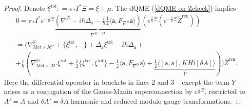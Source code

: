 \documentclass[11pt,a4paper]{amsart}
\theoremstyle{plain} %
\theoremstyle{definition}
\theoremstyle{remark}
\newcommand{\mr}{\mathrm}
\newcommand{\sfa}{\mathsf{a}}
\newcommand{\M}{\mathcal{M}}
\newcommand{\mc}{\mathcal}
\begin{document}
\begin{proof}%
    Denote $\xi^\mr{tot}\colon = \pi_*I^* \Xi=\xi+\mu$. The dQME (\ref{dQME on Zcheck}) implies 
    \begin{multline}\label{lemma 5.11 proof eq1}
    0=\pi_*I^* e^{-\frac{i}{\hbar}\Xi}\underbrace{(\nabla^\mc{D}-i\hbar\Delta_\sfa-\frac{i}{\hbar}\frac12 \langle \sfa, F_{\nabla^\mathbb{H}}\sfa\rangle)}_{\nabla^{G-M}} (e^{\frac{i}{\hbar}\Xi}(e^{-\frac{i}{\hbar}\Xi} \check{Z}^\mr{ren}) )\\
    =
    \Big(\nabla^\mathbb{H}_{\mr{Met}\times \M'}+\{\xi^\mr{tot},-\}+\Delta_\sfa \xi^\mr{tot}-i\hbar\Delta_\sfa+\\
    +\frac{i}{\hbar}(\nabla^\mathbb{H}_{\mr{Met}\times \M'}\xi^\mr{tot}+\frac12 \{\xi^\mr{tot},\xi^\mr{tot}\}-\frac12 \langle \sfa, F_{\nabla^\mathbb{H}}\sfa\rangle +\underbrace{\frac12\langle [\sfa,\sfa],KHi[\delta A] \rangle}_Y) 
    \Big) \overline{Z}^\mr{ren}.
    \end{multline}
    Here  the differential operator in brackets in lines 2 and 3 -- except the term $Y$ -- arises as a conjugation of the Gauss-Manin superconnection by $e^{\frac{i}{\hbar}\Xi}$, restricted to $A'=A$ and $\delta A'=\delta A$ harmonic and reduced modulo gauge transformations. 
    

\end{proof}
\end{document}
